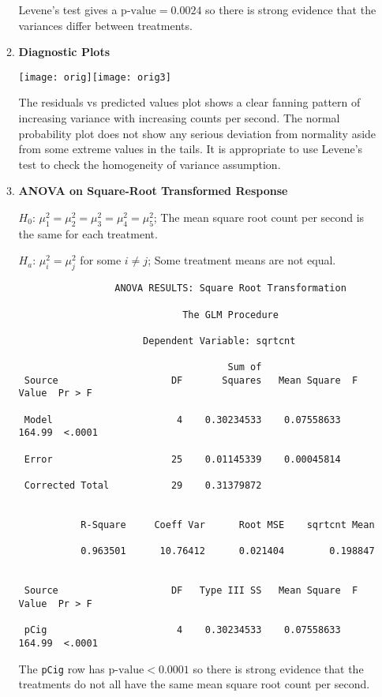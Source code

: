 \documentclass[11pt]{article}
\begin{document}
\begin{enumerate}
\begin{enumerate}
Levene's test gives a \(\text{p-value}=0.0024\) so there is strong evidence
that the variances differ between treatments.

\item %
\textbf{Diagnostic Plots}

\texttt{[image: orig]}\texttt{[image: orig3]}

The residuals vs predicted values plot shows a clear fanning pattern of
increasing variance with increasing counts per second. The normal probability
plot does not show any serious deviation from normality aside from some extreme
values in the tails. It is appropriate to use Levene's test to check the
homogeneity of variance assumption.

\pagebreak
\item %
\textbf{ANOVA on Square-Root Transformed Response}

\(H_0\): \(\mu^2_1=\mu^2_2=\mu^2_3=\mu^2_4=\mu^2_5\); The mean square root
count per second is the same for each treatment.

\(H_a\): \(\mu^2_i=\mu^2_j\) for some \(i\neq j\); Some treatment means are not
equal.

\begin{verbatim}
                 ANOVA RESULTS: Square Root Transformation

                             The GLM Procedure
 
                      Dependent Variable: sqrtcnt   

                                     Sum of
 Source                    DF       Squares   Mean Square  F Value  Pr > F

 Model                      4    0.30234533    0.07558633   164.99  <.0001

 Error                     25    0.01145339    0.00045814                 

 Corrected Total           29    0.31379872                               


           R-Square     Coeff Var      Root MSE    sqrtcnt Mean

           0.963501      10.76412      0.021404        0.198847


 Source                    DF   Type III SS   Mean Square  F Value  Pr > F

 pCig                       4    0.30234533    0.07558633   164.99  <.0001
\end{verbatim}

The \verb|pCig| row has \(\text{p-value}<0.0001\) so there is strong evidence
that the treatments do not all have the same mean square root count per second.


\end{enumerate}
\end{enumerate}
\end{document}

